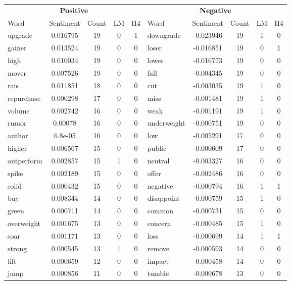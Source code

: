 \documentclass[ oneside,%
                    author={Joshua Felmeden},
                    degree={MEng},
                     title={Sentiment Analysis of Financial Headlines Based on Realised Stock Returns},
                  subtitle={Research}]{dissertation}
\begin{document}
\begin{table}[!ht]
\centering
\begin{tabular}{lcccclcccc}
\multicolumn{5}{c}{\textbf{Positive}} & \multicolumn{5}{c}{\textbf{Negative}} \\
\cmidrule(lr){1-5}
\cmidrule(lr){6-10}
Word & Sentiment & Count & LM & H4 & Word & Sentiment & Count & LM & H4 \\
\cmidrule(lr){1-5}
\cmidrule(lr){6-10}
upgrade & 0.016795 & 19 & 0 & 1 & downgrade & -0.023946 & 19 & 1 & 0 \\
gainer & 0.013524 & 19 & 0 & 0 & loser & -0.016851 & 19 & 0 & 1 \\
high & 0.010034 & 19 & 0 & 0 & lower & -0.016773 & 19 & 0 & 0 \\
mover & 0.007526 & 19 & 0 & 0 & fall & -0.004345 & 19 & 0 & 0 \\
rais & 0.011851 & 18 & 0 & 0 & cut & -0.003035 & 19 & 1 & 0 \\
repurchase & 0.000298 & 17 & 0 & 0 & miss & -0.001481 & 19 & 1 & 0 \\
volume & 0.002742 & 16 & 0 & 0 & weak & -0.001191 & 19 & 1 & 0 \\
rumor & 0.00078 & 16 & 0 & 0 & underweight & -0.000751 & 19 & 0 & 0 \\
author & 6.8e-05 & 16 & 0 & 0 & low & -0.005291 & 17 & 0 & 0 \\
higher & 0.006567 & 15 & 0 & 0 & public & -0.000609 & 17 & 0 & 0 \\
outperform & 0.002857 & 15 & 1 & 0 & neutral & -0.003327 & 16 & 0 & 0 \\
spike & 0.002189 & 15 & 0 & 0 & offer & -0.002486 & 16 & 0 & 0 \\
solid & 0.000432 & 15 & 0 & 0 & negative & -0.000794 & 16 & 1 & 1 \\
buy & 0.008344 & 14 & 0 & 0 & disappoint & -0.000759 & 15 & 1 & 0 \\
green & 0.000711 & 14 & 0 & 0 & common & -0.000731 & 15 & 0 & 0 \\
overweight & 0.001675 & 13 & 0 & 0 & concern & -0.000485 & 15 & 1 & 0 \\
soar & 0.001171 & 13 & 0 & 0 & loss & -0.000699 & 14 & 1 & 1 \\
strong & 0.000545 & 13 & 1 & 0 & remove & -0.000593 & 14 & 0 & 0 \\
lift & 0.000659 & 12 & 0 & 0 & impact & -0.000458 & 14 & 0 & 0 \\
jump & 0.000856 & 11 & 0 & 0 & tumble & -0.000678 & 13 & 0 & 0 \\

\end{tabular}
\end{table}
\end{document}
